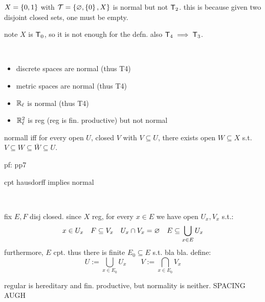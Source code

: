 \begin{xmp}[source=Primary Source Material]
    $X=\left\{{0,1}\right\}$ with $\mathcal{T}=\left\{{\varnothing,\left\{{0}\right\},X}\right\}$ is normal but not
    $\mathsf{T}_{2}$.
    this is because given two disjoint closed sets, one must be empty.

    note $X$ is $\mathsf{T}_{0}$, so it is not enough for the defn.
    also $\mathsf{T}_{4}\implies\mathsf{T}_{3}$.
\end{xmp} \

\begin{xmp}[source=Primary Source Material]
    \vspace{-0.35in}
    \begin{itemize}
        \item discrete spaces are normal (thus T4)
        \item metric spaces are normal (thus T4)
        \item $\mathbb{R}_{\ell}$ is normal (thus T4)
        \item $\mathbb{R}_{\ell}^{2}$ is reg (reg is fin. productive) but not normal
    \end{itemize}
\end{xmp}

\begin{prop}
    normall iff for every open $U$, closed $V$ with $V\subseteq U$,
    there exists open $W\subseteq X$ s.t.
    $V\subseteq W\subseteq\bar{W}\subseteq U$.
\end{prop}
pf: pp7

\begin{prop}
    cpt hausdorff implies normal
\end{prop} \

\begin{pf}[source=Primary Source Material]
    fix $E,F$ disj closed.
    since $X$ reg, for every $x\in E$ we have open $U_{x},V_{x}$ s.t.:
    \begin{equation*}
        x\in U_{x} \quad F\subseteq V_{x} \quad U_{x}\cap V_{x}=\varnothing \quad
        E\subseteq \bigcup_{x\in E}U_{x}
    \end{equation*}
    furthermore, $E$ cpt.
    thus there is finite $E_{0}\subseteq E$ s.t. bla bla. define:
    \begin{equation*}
        U:=\bigcup_{x\in E_{0}}U_{x} \qquad V:=\bigcap_{x\in E_{0}}V_{x}
    \end{equation*}
\end{pf}
regular is hereditary and fin. productive, but normality is neither.
SPACING AUGH


